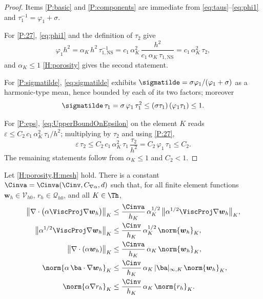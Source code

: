 \begin{proof}
Items \ref{P:basic} and \ref{P:components} are immediate from
\eqref{eq:taus}--\eqref{eq:phi1} and $\tau_1^{-1}=\varphi_1+\sigma$.

For \ref{P:27}, \eqref{eq:phi1} and the definition of $\tau_2$ give
\begin{equation*}
  \varphi_1 h^2 = \alpha_K\,h^2\,\tau_{1,\mathrm{NS}}^{-1}
  = c_1\,\alpha_K^2\,\frac{h^2}{c_1\,\alpha_K\,\tau_{1,\mathrm{NS}}}
  = c_1\,\alpha_K^2\,\tau_2 ,
\end{equation*}
and $\alpha_K\le1$ \cref{H:porosity} gives the second statement.

For \ref{P:sigmatilde}, \eqref{eq:sigmatilde} exhibits
$\sigmatilde=\sigma\varphi_1/(\varphi_1+\sigma)$ as a harmonic-type mean, hence bounded by
each of its two factors; moreover
\begin{equation*}
  \sigmatilde\,\tau_1 = \sigma\,\varphi_1\,\tau_1^2
  \le (\sigma\tau_1)\,(\varphi_1\tau_1)\le 1 .
\end{equation*}

For \ref{P:eps}, \eqref{eq:UpperBoundOnEpsilon} on the element $K$ reads
$\varepsilon\le C_2\,c_1\,\alpha_K^2\,\tau_1/h^2$; multiplying by $\tau_2$ and using
\ref{P:27},
\begin{equation*}
  \varepsilon\,\tau_2 \le C_2\,c_1\,\alpha_K^2\,\tau_1\,\frac{\tau_2}{h^2}
  = C_2\,\varphi_1\,\tau_1 \le C_2 .
\end{equation*}
The remaining statements follow from $\alpha_K\le 1$ and $C_2<1$.
\end{proof}

\begin{lemma}\label{lem:winv}
Let \cref{H:porosity,H:mesh} hold. There is a constant
$\Cinva = \Cinva(\Cinv,C_{\nabla\alpha},d)$ such that, for all
finite element functions $\boldsymbol{w}_h\in\mathcal{V}_{h0}$,
$r_h\in\mathcal{Q}_{h0}$, and all $K\in\Th$,
\begin{align}
  \bigl\lVert\nabla\cdot\bigl(\alpha\ViscProj\nabla\boldsymbol{w}_h\bigr)
  \bigr\rVert_{K}
  &\le \frac{\Cinva}{h_K}\,\alpha_K^{1/2}\,
  \bigl\lVert\alpha^{1/2}\ViscProj\nabla\boldsymbol{w}_h\bigr\rVert_{K},
  \label{eq:winv-divvisc}\\
  \bigl\lVert\alpha^{1/2}\ViscProj\nabla\boldsymbol{w}_h\bigr\rVert_{K}
  &\le \frac{\Cinv}{h_K}\,\alpha_K^{1/2}\,
  \norm{\boldsymbol{w}_h}_{K},
  \label{eq:winv-grad}\\
  \bigl\lVert\nabla\cdot(\alpha\boldsymbol{w}_h)\bigr\rVert_{K}
  &\le \frac{\Cinva}{h_K}\,\alpha_K\,\norm{\boldsymbol{w}_h}_{K},
  \label{eq:winv-divu}\\
  \norm{\alpha\,\ba\cdot\nabla\boldsymbol{w}_h}_{K}
  &\le \frac{\Cinv}{h_K}\,\alpha_K\,|\ba|_{\infty,K}\,
  \norm{\boldsymbol{w}_h}_{K},
  \label{eq:winv-conv}\\
  \norm{\alpha\nabla r_h}_{K}
  &\le \frac{\Cinv}{h_K}\,\alpha_K\,\norm{r_h}_{K}.
  \label{eq:winv-gradp}
\end{align}
\end{lemma}

